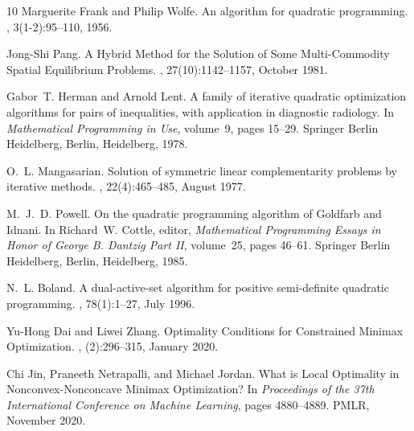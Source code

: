 \documentclass{article}
\begin{document}
\begin{thebibliography}{10}
		Marguerite Frank and Philip Wolfe.
		\newblock An algorithm for quadratic programming.
		, 3(1-2):95--110, 1956.
		
		Jong-Shi Pang.
		\newblock A {{Hybrid Method}} for the {{Solution}} of {{Some Multi-Commodity
				Spatial Equilibrium Problems}}.
		, 27(10):1142--1157, October 1981.
		
		Gabor~T. Herman and Arnold Lent.
		\newblock A family of iterative quadratic optimization algorithms for pairs of
		inequalities, with application in diagnostic radiology.
		\newblock In {\em Mathematical {{Programming}} in {{Use}}}, volume~9, pages
		15--29. Springer Berlin Heidelberg, Berlin, Heidelberg, 1978.
		
		O.~L. Mangasarian.
		\newblock Solution of symmetric linear complementarity problems by iterative
		methods.
		,
		22(4):465--485, August 1977.
		
		M.~J.~D. Powell.
		\newblock On the quadratic programming algorithm of {{Goldfarb}} and
		{{Idnani}}.
		\newblock In Richard~W. Cottle, editor, {\em Mathematical {{Programming
					Essays}} in {{Honor}} of {{George B}}. {{Dantzig Part II}}}, volume~25, pages
		46--61. Springer Berlin Heidelberg, Berlin, Heidelberg, 1985.
		
		N.~L. Boland.
		\newblock A dual-active-set algorithm for positive semi-definite quadratic
		programming.
		, 78(1):1--27, July 1996.
		
		Yu-Hong Dai and Liwei Zhang.
		\newblock Optimality {{Conditions}} for {{Constrained Minimax Optimization}}.
		, (2):296--315,
		January 2020.
		
		Chi Jin, Praneeth Netrapalli, and Michael Jordan.
		\newblock What is {{Local Optimality}} in {{Nonconvex-Nonconcave Minimax
				Optimization}}?
		\newblock In {\em Proceedings of the 37th {{International Conference}} on
			{{Machine Learning}}}, pages 4880--4889. PMLR, November 2020.
		

\end{thebibliography}
\end{document}

